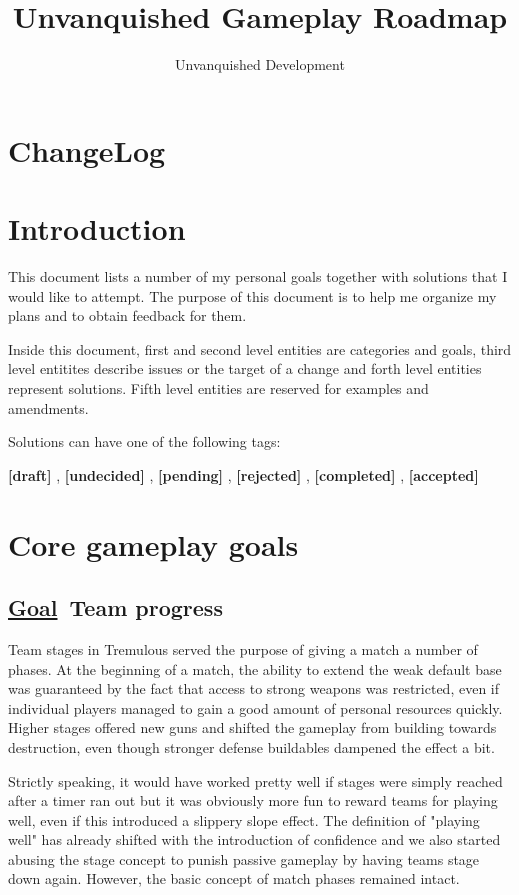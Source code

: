 \documentclass{scrartcl}
\title{Unvanquished Gameplay Roadmap}
\author{Unvanquished Development}
\date{}
\newcommand{\goal}     [0]{\textbf{\underline{Goal}\ }}
\newcommand{\draft}    [0]{\textcolor{draft}    {\textbf{[draft] }}}
\newcommand{\undecided}[0]{\textcolor{undecided}{\textbf{[undecided] }}}
\newcommand{\pending}  [0]{\textcolor{pending}  {\textbf{[pending] }}}
\newcommand{\rejected} [0]{\textcolor{rejected} {\textbf{[rejected] }}}
\newcommand{\completed}[0]{\textcolor{completed}{\textbf{[completed] }}}
\newcommand{\accepted} [0]{\textcolor{completed}{\textbf{[accepted] }}}
\begin{document}
\maketitle
\tableofcontents

\section{ChangeLog}



\section{Introduction}

This document lists a number of my personal goals together with solutions that I would like to attempt. The purpose of this document is to help me organize my plans and to obtain feedback for them.

Inside this document, first and second level entities are categories and goals, third level entitites describe issues or the target of a change and forth level entities represent solutions. Fifth level entities are reserved for examples and amendments.

Solutions can have one of the following tags:

\draft, \undecided, \pending, \rejected, \completed, \accepted

\section{Core gameplay goals}

\subsection{\goal Team progress}
\label{team-progress}

Team stages in Tremulous served the purpose of giving a match a number of phases. At the beginning of a match, the ability to extend the weak default base was guaranteed by the fact that access to strong weapons was restricted, even if individual players managed to gain a good amount of personal resources quickly. Higher stages offered new guns and shifted the gameplay from building towards destruction, even though stronger defense buildables dampened the effect a bit.

Strictly speaking, it would have worked pretty well if stages were simply reached after a timer ran out but it was obviously more fun to reward teams for playing well, even if this introduced a slippery slope effect. The definition of "playing well" has already shifted with the introduction of confidence and we also started abusing the stage concept to punish passive gameplay by having teams stage down again. However, the basic concept of match phases remained intact.
\end{document}
